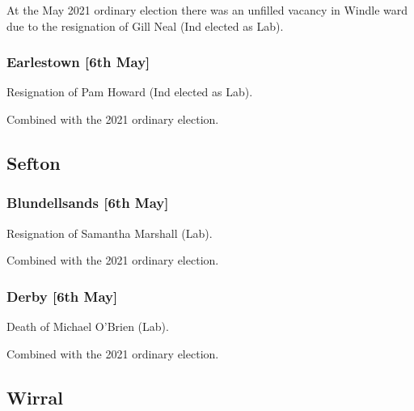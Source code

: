 \documentclass[a4paper,openany]{book}
\begin{document}
\begin{resultsiii}
At the May 2021 ordinary election there was an unfilled vacancy in Windle ward due to the resignation of Gill Neal (Ind elected as Lab).

\subsubsection*{Earlestown \hspace*{\fill}\nolinebreak[1]%
	\enspace\hspace*{\fill}
	[6th May]}


Resignation of Pam Howard (Ind elected as Lab).

Combined with the 2021 ordinary election.

\subsection*{Sefton}

\subsubsection*{Blundellsands \hspace*{\fill}\nolinebreak[1]%
	\enspace\hspace*{\fill}
	[6th May]}


Resignation of Samantha Marshall (Lab).

Combined with the 2021 ordinary election.

\subsubsection*{Derby \hspace*{\fill}\nolinebreak[1]%
	\enspace\hspace*{\fill}
	[6th May]}


Death of Michael O'Brien (Lab).

Combined with the 2021 ordinary election.

\subsection*{Wirral}


\end{resultsiii}
\end{document}
